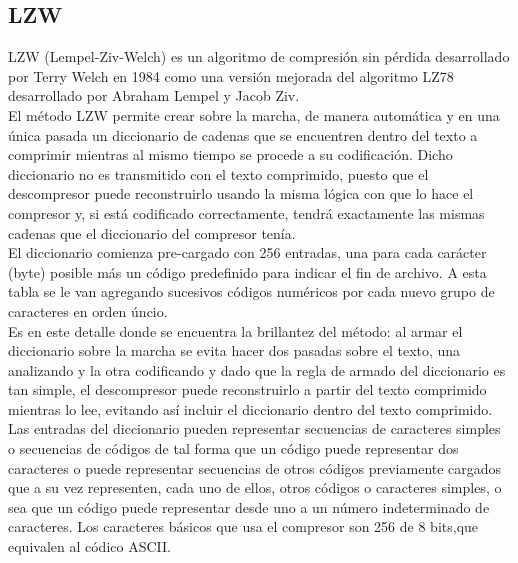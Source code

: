 \documentclass[letterpaper]{article}
\begin{document}
\subsection{LZW}

LZW (Lempel-Ziv-Welch) es un algoritmo de compresión sin pérdida desarrollado por Terry Welch en 1984 como una versión mejorada del algoritmo LZ78 desarrollado por Abraham Lempel y Jacob Ziv.\\

El método LZW permite crear sobre la marcha, de manera automática y en una única pasada un diccionario de cadenas que se encuentren dentro del texto a comprimir mientras al mismo tiempo se procede a su codificación. Dicho diccionario no es transmitido con el texto comprimido, puesto que el descompresor puede reconstruirlo usando la misma lógica con que lo hace el compresor y, si está codificado correctamente, tendrá exactamente las mismas cadenas que el diccionario del compresor tenía.\\

El diccionario comienza pre-cargado con 256 entradas, una para cada carácter (byte) posible más un código predefinido para indicar el fin de archivo. A esta tabla se le van agregando sucesivos códigos numéricos por cada nuevo grupo de caracteres en orden úncio.\\

Es en este detalle donde se encuentra la brillantez del método: al armar el diccionario sobre la marcha se evita hacer dos pasadas sobre el texto, una analizando y la otra codificando y dado que la regla de armado del diccionario es tan simple, el descompresor puede reconstruirlo a partir del texto comprimido mientras lo lee, evitando así incluir el diccionario dentro del texto comprimido.\\

Las entradas del diccionario pueden representar secuencias de caracteres simples o secuencias de códigos de tal forma que un código puede representar dos caracteres o puede representar secuencias de otros códigos previamente cargados que a su vez representen, cada uno de ellos, otros códigos o caracteres simples, o sea que un código puede representar desde uno a un número indeterminado de caracteres. Los caracteres básicos que usa el compresor son 256 de 8 bits,que equivalen al códico ASCII.\\
\end{document}
